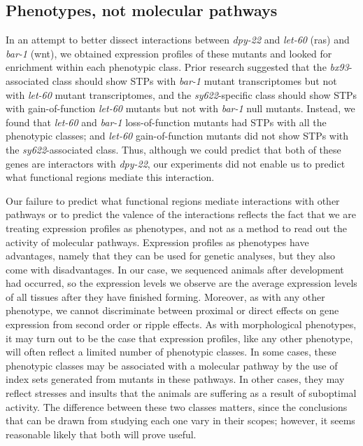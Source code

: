 \documentclass[8pt, twocolumn]{article}
\newcommand{\gene}[1]{\mbox{\emph{#1}}}
\newcommand{\dpy}[1]{\gene{dpy-22#1}}
\begin{document}
\subsection*{Phenotypes, not molecular pathways}
In an attempt to better dissect interactions between \dpy{} and \gene{let-60}
(ras) and \gene{bar-1} (wnt), we obtained expression profiles of these mutants
and looked for enrichment within each phenotypic class. Prior research suggested
that the \emph{bx93}-associated class should show STPs with \gene{bar-1} mutant
transcriptomes but not with \gene{let-60} mutant transcriptomes, and the
\emph{sy622}-specific class should show STPs with gain-of-function \gene{let-60}
mutants but not with \gene{bar-1} null mutants. Instead, we found that
\gene{let-60} and \gene{bar-1} loss-of-function mutants had STPs with all the
phenotypic classes; and \gene{let-60} gain-of-function mutants did not show STPs
with the \emph{sy622}-associated class. Thus, although we could predict that
both of these genes are interactors with \dpy{}, our experiments did not enable
us to predict what functional regions mediate this interaction.

Our failure to predict what functional regions mediate interactions with other
pathways or to predict the valence of the interactions reflects the fact that we
are treating expression profiles as phenotypes, and not as a method to read out
the activity of molecular pathways. Expression profiles as phenotypes have
advantages, namely that they can be used for genetic analyses, but they also
come with disadvantages. In our case, we sequenced animals after development had
occurred, so the expression levels we observe are the average expression levels
of all tissues after they have finished forming. Moreover, as with any other
phenotype, we cannot discriminate between proximal or direct effects on gene
expression from second order or ripple effects. As with morphological
phenotypes, it may turn out to be the case that expression profiles, like any
other phenotype, will often reflect a limited number of phenotypic classes. In
some cases, these phenotypic classes may be associated with a molecular pathway
by the use of index sets generated from mutants in these pathways. In other
cases, they may reflect stresses and insults that the animals are suffering as a
result of suboptimal activity. The difference between these two classes matters,
since the conclusions that can be drawn from studying each one vary in their
scopes; however, it seems reasonable likely that both will prove useful.
\end{document}
